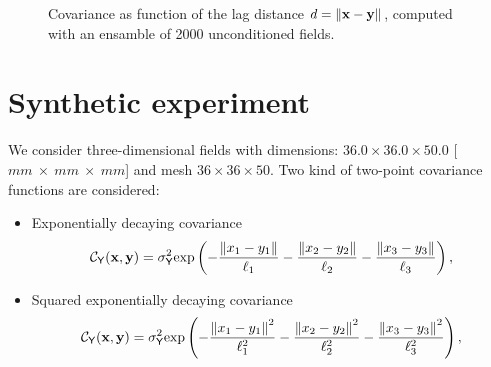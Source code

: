\begin{figure}[H]
 \caption{Covariance as function of the lag distance $d=\lVert \mathbf{x} - \mathbf{y} \rVert$, computed with an ensamble of 2000 unconditioned fields.}
 \label{fig-uncondCov}
\end{figure}

\section{Synthetic experiment}

We consider three-dimensional fields with dimensions: $36.0 \times 36.0 \times 50.0$ [$mm~\times~mm~\times~mm$] and mesh $36 \times 36 \times 50$.
Two kind of two-point covariance functions are considered:

\begin{itemize}
 \item Exponentially decaying covariance
 \begin{equation}
 \mathcal{C}_{\mathsf{Y}}(\mathbf{x}, \mathbf{y}) = {\sigma_{\mathsf{Y}}^{2}}\mbox{exp}\left(-\dfrac{\left\| x_1 - y_1 \right\|}{\ell_{1}}-\dfrac{\left\| x_2 - y_2 \right\|}{\ell_{2}}-\dfrac{\left\| x_3 - y_3 \right\|}{\ell_{3}}  \right),
 \label{eq-expcov}
\end{equation}

 \item Squared exponentially decaying covariance
\begin{equation}
 \mathcal{C}_{\mathsf{Y}}(\mathbf{x}, \mathbf{y}) = {\sigma_{\mathsf{Y}}^{2}}\mbox{exp}\left(-\dfrac{\left\| x_1 - y_1 \right\|^2}{\ell_{1}^{2}}-\dfrac{\left\| x_2 - y_2 \right\|^2}{\ell_{2}^{2}}-\dfrac{\left\| x_3 - y_3 \right\|^2}{\ell_{3}^{2}}  \right),
 \label{eq-squarecov}
\end{equation}
\end{itemize}


